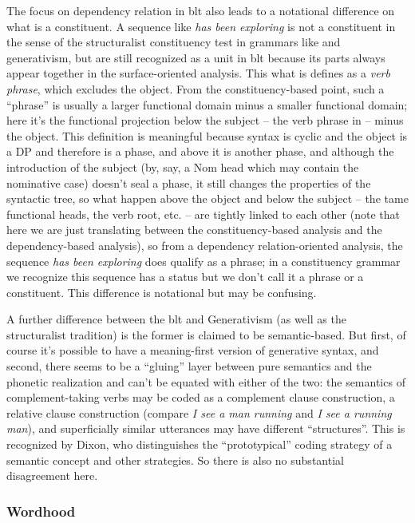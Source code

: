 \documentclass[UTF8, a4paper, oneside, scheme=plain, 12pt]{ctexrep}
\newcommand*{\citepage}[1]{p.~{#1}}
\newcommand*{\term}[1]{\emph{#1}}
\newcommand{\form}[1]{\emph{#1}}
\begin{document}
{The focus on dependency relation in \acs{blt} also leads to 
a notational difference on what is a constituent.
A sequence like \form{has been exploring} is not a constituent in the sense of 
the structuralist constituency test in grammars like \citet{cgel} and generativism,
but are still recognized as a unit in \acs{blt} 
because its parts always appear together in the surface-oriented analysis.
This what is \citet[\citepage{109}]{dixon2009basic} defines 
as a \term{verb phrase},
which excludes the object. 
From the constituency-based point, 
such a ``phrase'' is usually a larger functional domain minus a smaller functional domain;
here it's the functional projection below the subject -- the verb phrase in \citet{cgel} --
minus the object.
This definition is meaningful 
because syntax is cyclic 
and the object is a DP and therefore is a phase, 
and above it is another phase, 
and although the introduction of the subject 
(by, say, a Nom head which may contain the nominative case) 
doesn't seal a phase, 
it still changes the properties of the syntactic tree, 
so what happen above the object and below the subject 
-- the \acs{tame} functional heads, the verb root, etc. -- 
are tightly linked to each other
(note that here we are just translating between 
the constituency-based analysis and the dependency-based analysis), 
so from a dependency relation-oriented analysis, 
the sequence \form{has been exploring} does qualify as a phrase; 
in a constituency grammar 
we recognize this sequence has a status 
but we don't call it a phrase or a constituent.
This difference is notational but may be confusing.

A further difference between the \acl{blt} and Generativism (as well as the structuralist tradition)
is the former is claimed to be semantic-based.
But first, of course it's possible to have a meaning-first version of generative syntax,
and second,
there seems to be a ``gluing'' layer between pure semantics and 
the phonetic realization 
and can't be equated with either of the two: 
the semantics of complement-taking verbs 
may be coded as a complement clause construction, 
a relative clause construction 
(compare \form{I see a man running} and \form{I see a running man}),
and superficially similar utterances may have different ``structures''.
This is recognized by Dixon, 
who distinguishes the ``prototypical'' coding strategy of a semantic concept 
and other strategies.
So there is also no substantial disagreement here.

\subsubsection{Wordhood}

}
\end{document}

